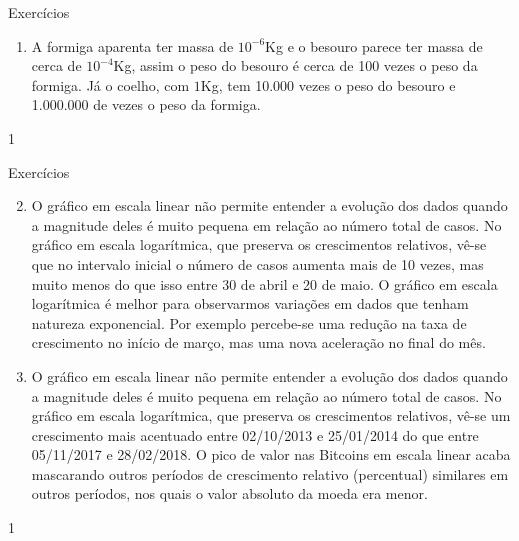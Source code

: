 \begin{answer}{Exercícios}
{\exerciselist

\begin{enumerate}

\item A formiga aparenta ter massa de $10^{-6}$Kg e o besouro parece ter massa de cerca de $10^{-4}$Kg, assim o peso do besouro é cerca de 100 vezes o peso da formiga. Já o coelho, com $1$Kg, tem 10.000 vezes o peso do besouro e 1.000.000 de vezes o peso da formiga.
\end{enumerate}
}{1}
\end{answer}
\clearmargin
\begin{answer}{Exercícios}
{
\exerciselist
\begin{enumerate}
\setcounter{enumi}{1}
\item O gráfico em escala linear não permite entender a evolução dos dados quando a magnitude deles é muito pequena em relação ao número total de casos. No gráfico em escala logarítmica, que preserva os crescimentos relativos, vê-se que no intervalo inicial o número de casos aumenta mais de 10 vezes, mas muito menos do que isso entre 30 de abril e 20 de maio. O gráfico em escala logarítmica é melhor para observarmos variações em dados que tenham natureza exponencial. Por exemplo percebe-se uma redução na taxa de crescimento no início de março, mas uma nova aceleração no final do mês.
\item O gráfico em escala linear não permite entender a evolução dos dados quando a magnitude deles é muito pequena em relação ao número total de casos. No gráfico em escala logarítmica, que preserva os crescimentos relativos, vê-se um crescimento mais acentuado entre 02/10/2013 e 25/01/2014 do que entre 05/11/2017 e 28/02/2018. O pico de valor nas Bitcoins em escala linear acaba mascarando outros períodos de crescimento relativo (percentual) similares em outros períodos, nos quais o valor absoluto da moeda era menor.
\end{enumerate}
}{1}
\end{answer}
\clearmargin
